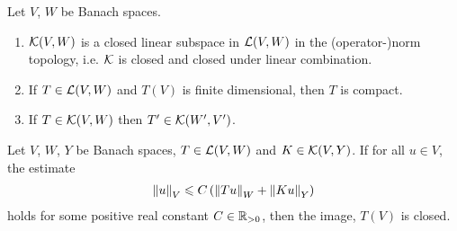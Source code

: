 \documentclass[12pt]{article}
\begin{document}
\begin{flemma} Let $V$, $W$ be Banach spaces. 
    \begin{enumerate}
        \item $\K(V, W)$ is a closed linear subspace in $\L(V, W)$ in the (operator-)norm topology, i.e. $\K$ is closed and closed under linear combination. 
        \item If $T \in \L(V, W)$ and $T(V)$ is finite dimensional, then $T$ is compact. 
        \item If $T \in \K(V, W)$ then $T' \in \K(W', V')$. 
    \end{enumerate}
\end{flemma}

\begin{ftheorem} 
    Let $V$, $W$, $Y$ be Banach spaces, $T \in \L(V, W)$ and $K \in \K(V, Y)$. If for all $u \in V$, the estimate 
    \begin{align*}
    \norm[u]_V \leq C \brac{\norm[Tu]_W + \norm[Ku]_Y}
    \end{align*}
    holds for some positive real constant $C \in \R_{> 0}$, then the image, $T(V)$ is closed. 
\end{ftheorem}
\end{document}

